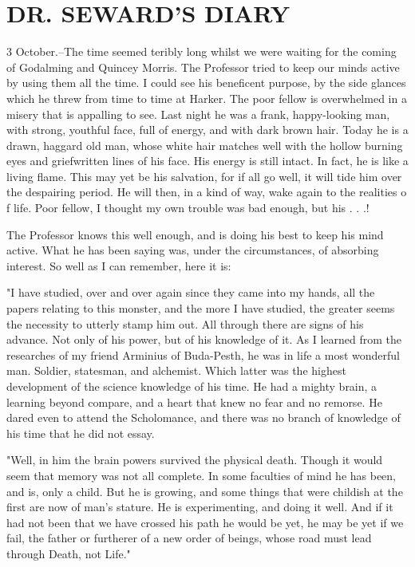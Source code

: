 \chapter{DR. SEWARD'S DIARY}

3 October.--The time seemed teribly long whilst we were waiting for the coming of Godalming and Quincey Morris. The Professor tried to keep our minds active by using them all the time. I could see his beneficent purpose, by the side glances which he threw from time to time at Harker. The poor fellow is overwhelmed in a misery that is appalling to see. Last night he was a frank, happy-looking man, with strong, youthful face, full of energy, and with dark brown hair. Today he is a drawn, haggard old man, whose white hair matches well with the hollow burning eyes and griefwritten lines of his face. His energy is still intact. In fact, he is like a living flame. This may yet be his salvation, for if all go well, it will tide him over the despairing period. He will then, in a kind of way, wake again to the realities o f life. Poor fellow, I thought my own trouble was bad enough, but his . . .! 

The Professor knows this well enough, and is doing his best to keep his mind active. What he has been saying was, under the circumstances, of absorbing interest. So well as I can remember, here it is: 

"I have studied, over and over again since they came into my hands, all the papers relating to this monster, and the more I have studied, the greater seems the necessity to utterly stamp him out. All through there are signs of his advance. Not only of his power, but of his knowledge of it. As I learned from the researches of my friend Arminius of Buda-Pesth, he was in life a most wonderful man. Soldier, statesman, and alchemist. Which latter was the highest development of the science knowledge of his time. He had a mighty brain, a learning beyond compare, and a heart that knew no fear and no remorse. He dared even to attend the Scholomance, and there was no branch of knowledge of his time that he did not essay. 

"Well, in him the brain powers survived the physical death. Though it would seem that memory was not all complete. In some faculties of mind he has been, and is, only a child. But he is growing, and some things that were childish at the first are now of man's stature. He is experimenting, and doing it well. And if it had not been that we have crossed his path he would be yet, he may be yet if we fail, the father or furtherer of a new order of beings, whose road must lead through Death, not Life." 

